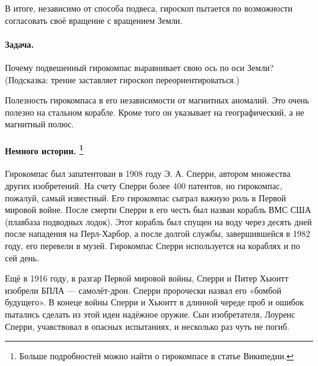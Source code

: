 В итоге, независимо от способа подвеса, гироскоп пытается по возможности согласовать своё вращение с вращением Земли.

\paragraph{Задача.} Почему подвешенный гирокомпас выравнивает свою ось по оси Земли?
(Подсказка: трение заставляет гироскоп переориентироваться.)

Полезность гирокомпаса в его независимости от магнитных аномалий.
Это очень полезно на стальном корабле.
Кроме того он указывает на географический, а не магнитный полюс.

\paragraph[Немного истории.]%
{Немного истории.%
\footnote{Больше подробностей можно найти о гирокомпасе в статье Википедии.}
}
Гирокомпас был запатентован в 1908 году Э. А. Сперри, автором множества других изобретений.
На счету Сперри более 400 патентов, но гирокомпас, пожалуй, самый известный.
Его гирокомпас сыграл важную роль в Первой мировой войне.
После смерти Сперри в его честь был назван корабль ВМС США (плавбаза подводных лодок).
Этот корабль был спущен на воду через десять дней после нападения на Перл-Харбор, а после долгой службы, завершившейся в 1982 году, его перевели в музей.
Гирокомпас Сперри используется на кораблях и по сей день.

Ещё в 1916 году, в разгар Первой мировой войны,
Сперри и Питер Хьюитт изобрели БПЛА --- самолёт-дрон.
Сперри пророчески назвал его «бомбой будущего».
В конеце войны Сперри и Хьюитт в длинной череде проб и ошибок пытались сделать из этой идеи надёжное оружие.
Сын изобретателя, Лоуренс Сперри, учавствовал в опасных испытаниях, и несколько раз чуть не погиб.
